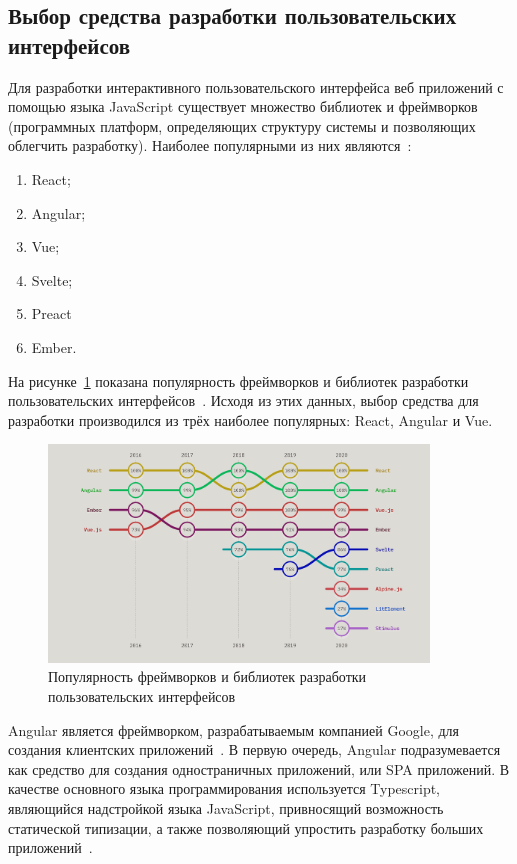 \subsection{Выбор средства разработки пользовательских интерфейсов}

Для разработки интерактивного пользовательского интерфейса веб приложений с помощью языка JavaScript существует множество библиотек и фреймворков (программных платформ, определяющих структуру системы и позволяющих облегчить разработку). Наиболее популярными из них являются~\cite{stateofjs}:

\begin{enumerate}
  \item React;
  \item Angular;
  \item Vue;
  \item Svelte;
  \item Preact
  \item Ember.
\end{enumerate}

На рисунке~\ref{img:stateofjs__rank-usage} показана популярность фреймворков и библиотек разработки пользовательских интерфейсов~\cite{stateofjs}. Исходя из этих данных, выбор средства для разработки производился из трёх наиболее популярных: React, Angular и Vue.

\begin{figure}[H]
  \centering
  \includegraphics[width=0.9\textwidth]{assets/images/theoretical2/usageRank.png}
  \caption{Популярность фреймворков и библиотек разработки пользовательских интерфейсов}
  \label{img:stateofjs__rank-usage}
\end{figure}

Angular является фреймворком, разрабатываемым компанией Google, для создания клиентских приложений~\cite{angular}. В первую очередь, Angular подразумевается как средство для создания одностраничных приложений, или SPA приложений. В качестве основного языка программирования используется Typescript, являющийся надстройкой языка JavaScript, привносящий возможность статической типизации, а также позволяющий упростить разработку больших приложений~\cite{typescript}.

